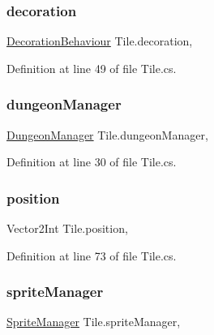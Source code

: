 \subsubsection{\texorpdfstring{decoration}{decoration}}
{\footnotesize\ttfamily \mbox{\hyperlink{class_decoration_behaviour}{Decoration\+Behaviour}} Tile.\+decoration\hspace{0.3cm}{\ttfamily [get]}, {\ttfamily [set]}}



Definition at line 49 of file Tile.\+cs.

\mbox{\label{class_tile_adcabb3e4a403331969c0b2c08c79ff1c}} 
\subsubsection{\texorpdfstring{dungeonManager}{dungeonManager}}
{\footnotesize\ttfamily \mbox{\hyperlink{class_dungeon_manager}{Dungeon\+Manager}} Tile.\+dungeon\+Manager\hspace{0.3cm}{\ttfamily [get]}, {\ttfamily [set]}}



Definition at line 30 of file Tile.\+cs.

\mbox{\label{class_tile_aa4046f981671278e33441b6f001b3e9e}} 
\subsubsection{\texorpdfstring{position}{position}}
{\footnotesize\ttfamily Vector2\+Int Tile.\+position\hspace{0.3cm}{\ttfamily [get]}, {\ttfamily [set]}}



Definition at line 73 of file Tile.\+cs.

\mbox{\label{class_tile_a4a7a173c171f17656e7aa129ed46c17c}} 
\subsubsection{\texorpdfstring{spriteManager}{spriteManager}}
{\footnotesize\ttfamily \mbox{\hyperlink{class_sprite_manager}{Sprite\+Manager}} Tile.\+sprite\+Manager\hspace{0.3cm}{\ttfamily [get]}, {\ttfamily [set]}}



